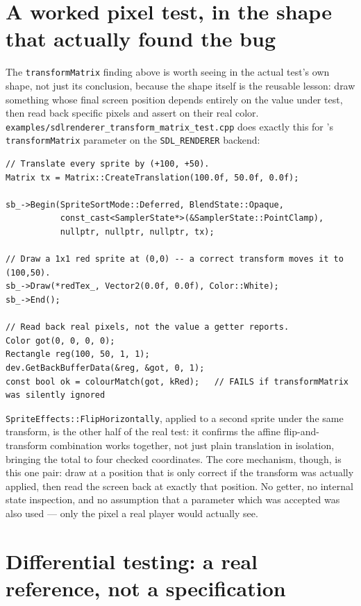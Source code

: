 \section{A worked pixel test, in the shape that actually found the bug}

The \texttt{transformMatrix} finding above is worth seeing in the actual test's own shape, not
just its conclusion, because the shape itself is the reusable lesson: draw something whose
final screen position depends entirely on the value under test, then read back specific pixels
and assert on their real color. \texttt{examples/sdlrenderer\_transform\_matrix\_test.cpp}
does exactly this for 's \texttt{transformMatrix} parameter on
the \texttt{SDL\_RENDERER} backend:

\begin{lstlisting}
// Translate every sprite by (+100, +50).
Matrix tx = Matrix::CreateTranslation(100.0f, 50.0f, 0.0f);

sb_->Begin(SpriteSortMode::Deferred, BlendState::Opaque,
           const_cast<SamplerState*>(&SamplerState::PointClamp),
           nullptr, nullptr, nullptr, tx);

// Draw a 1x1 red sprite at (0,0) -- a correct transform moves it to (100,50).
sb_->Draw(*redTex_, Vector2(0.0f, 0.0f), Color::White);
sb_->End();

// Read back real pixels, not the value a getter reports.
Color got(0, 0, 0, 0);
Rectangle reg(100, 50, 1, 1);
dev.GetBackBufferData(&reg, &got, 0, 1);
const bool ok = colourMatch(got, kRed);   // FAILS if transformMatrix was silently ignored
\end{lstlisting}

\texttt{SpriteEffects::FlipHorizontally}, applied to a second sprite under the same transform,
is the other half of the real test: it confirms the affine flip-and-transform combination
works together, not just plain translation in isolation, bringing the total to four checked
coordinates. The core mechanism, though, is this one pair: draw at a position that is only
correct if the transform was actually applied, then read the screen back at exactly that
position. No getter, no internal state inspection, and no assumption that a parameter which
was accepted was also used --- only the pixel a real player would actually see.

\section{Differential testing: a real reference, not a specification}

